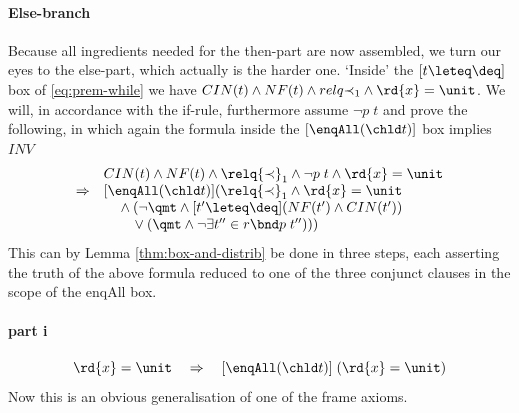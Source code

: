 \paragraph{Else-branch}
Because all ingredients needed for the then-part are now assembled, we turn our
eyes to the else-part, which actually is the harder one. `Inside' the $[t \leteq
\deq]$ box of \eqref{eq:prem-while}
we have $CIN(t) \land NF(t) \land relq {\prec}_1 \land \rd{x} =  \unit$. We will, in accordance with the if-rule,
furthermore assume $\lnot p\;t$ and prove the following, in which again the formula
inside the $[\enqAll (\chld t)]$ box implies $INV$
\begin{equation}
\label{eq:prem-else}
\begin{array}{l@{\quad}l}
&  CIN(t) \land NF(t) \land \relq {\prec}_1 \land \lnot p\;t \land \rd{x} =  \unit \\
\Rightarrow & [\enqAll (\chld t)](\relq {\prec}_1 \land \rd{x} =  \unit   \\
&  \quad {}\land (\lnot \qmt \land [t' \leteq \deq](NF(t') \land CIN(t')) \\
& \qquad  {}\lor (\qmt \land \lnot \exists t''\in r\bnd p\;t'')))
\end{array}
\end{equation}
This can by Lemma \ref{thm:box-and-distrib} be done in three steps, each asserting
the truth of the above formula reduced to one of the three conjunct clauses in
the scope of the enqAll box.

\paragraph{part i}
\[
\rd{x} = \unit \quad \Rightarrow 
\quad [\enqAll (\chld t)]\;(\rd{x} =  \unit )
\]
Now this is an obvious generalisation of one of the frame axioms.

